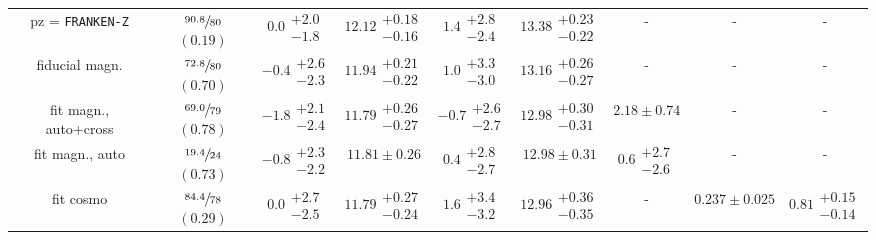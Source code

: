 \documentclass[a4paper,11pt]{article}
\begin{document}
\begin{table}
\begin{center}
\begin{tabular}{ccccccccc}
            pz = \texttt{FRANKEN-Z} & $\sfrac{90.8}{80}$ $(0.19)$ & $0.0\substack{+2.0 \\ -1.8}$ & $12.12\substack{+0.18 \\ -0.16}$ & $1.4\substack{+2.8 \\ -2.4}$ & $13.38\substack{+0.23 \\ -0.22}$ & - & - & - \\
            fiducial magn. & $\sfrac{72.8}{80}$ $(0.70)$ & $-0.4\substack{+2.6 \\ -2.3}$ & $11.94\substack{+0.21 \\ -0.22}$ & $1.0\substack{+3.3 \\ -3.0}$ & $13.16\substack{+0.26 \\ -0.27}$  & - & - & - \\
            fit magn., auto+cross & $\sfrac{69.0}{79}$ $(0.78)$ & $-1.8\substack{+2.1 \\ -2.4}$ & $11.79\substack{+0.26 \\ -0.27}$ & $-0.7\substack{+2.6 \\ -2.7}$ & $12.98\substack{+0.30 \\ -0.31}$  & $2.18 \pm 0.74$ & - & - \\
            fit magn., auto & $\sfrac{19.4}{24}$ $(0.73)$ & $-0.8\substack{+2.3 \\ -2.2}$ & $11.81 \pm 0.26$ & $0.4\substack{+2.8 \\ -2.7}$ & $12.98 \pm 0.31$  & $0.6\substack{+2.7 \\ -2.6}$ & - & - \\
            fit cosmo & $\sfrac{84.4}{78}$ $(0.29)$ & $0.0\substack{+2.7 \\ -2.5}$ & $11.79\substack{+0.27 \\ -0.24}$ & $1.6\substack{+3.4 \\ -3.2}$ & $12.96\substack{+0.36 \\ -0.35}$  & - & $0.237 \pm 0.025$ & $0.81\substack{+0.15 \\ -0.14}$ \\
            \hline \hline
          \end{tabular}
        \end{center}
      \end{table}
      
\end{document}
